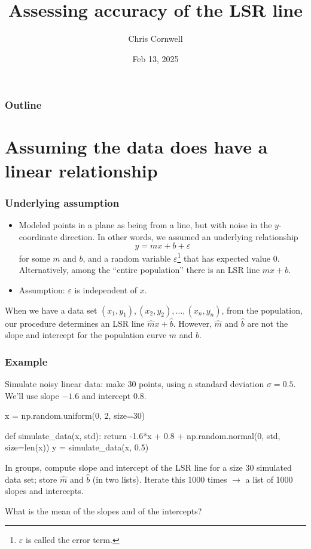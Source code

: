 \documentclass{beamer}
\author{Chris Cornwell}
\date{Feb 13, 2025}
\title{Assessing accuracy of the LSR line}
\newenvironment{codeblock}
    {\hfill\begin{beamerboxesrounded}[lower=codecol, width=0.8\textwidth]
    \medskip

    }
    { 
    \end{beamerboxesrounded}\hfill
    }
\theoremstyle{example}
\begin{document}
\begin{frame}
\titlepage
\end{frame}

\begin{frame}
\frametitle{Outline}
\tableofcontents
\end{frame}

\section{Assuming the data does have a linear relationship}

\begin{frame}
\frametitle{Underlying assumption}
\begin{itemize}
    \item Modeled points in a plane as being from a line, but with noise in the $y$-coordinate direction. In other words, we assumed an underlying relationship 
        \[y = mx + b + \varepsilon\]
    for some $m$ and $b$, and a random variable $\varepsilon$\footnote{$\varepsilon$ is called the error term.} that has expected value 0. Alternatively, among the ``entire population'' there is an LSR line $mx+b$. 
    \pause
    \item Assumption: $\varepsilon$ is independent of $x$.
\end{itemize}

When we have a data set $(x_1,y_1), (x_2,y_2), \ldots, (x_n,y_n)$, from the population, our procedure determines an LSR line $\hat{m}x + \hat{b}$. However, $\hat{m}$ and $\hat{b}$ are not the slope and intercept for the population curve $m$ and $b$.

\end{frame}

\begin{frame}[fragile]
\frametitle{Example}
Simulate noisy linear data: make 30 points, using a standard deviation $\sigma = 0.5$. We'll use slope $-1.6$ and intercept $0.8$.
\pause

\begin{codeblock}

\begin{python}
x = np.random.uniform(0, 2, size=30)

def simulate_data(x, std):
    return -1.6*x + 0.8 + np.random.normal(0, std, size=len(x))
y = simulate_data(x, 0.5)
\end{python}

\end{codeblock}

In groups, compute slope and intercept of the LSR line for a size 30 simulated data set; store $\hat{m}$ and $\hat{b}$ (in two lists). Iterate this 1000 times $\to$ a list of 1000 slopes and intercepts. 

What is the mean of the slopes and of the intercepts?

\end{frame}
\end{document}
